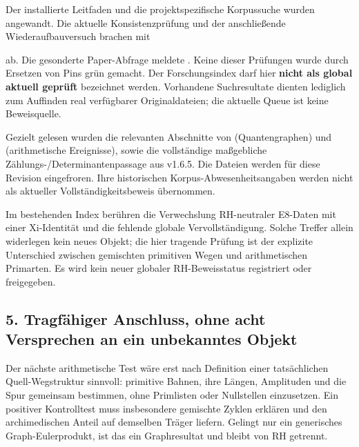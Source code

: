 Der installierte Leitfaden  und die
projektspezifische Korpussuche wurden angewandt. Die aktuelle
Konsistenzprüfung und der anschließende Wiederaufbauversuch brachen mit


ab. Die gesonderte Paper-Abfrage meldete
. Keine dieser Prüfungen
wurde durch Ersetzen von Pins grün gemacht. Der Forschungsindex darf
hier \textbf{nicht als global aktuell geprüft} bezeichnet werden.
Vorhandene Suchresultate dienten lediglich zum Auffinden real
verfügbarer Originaldateien; die aktuelle Queue ist keine Beweisquelle.

Gezielt gelesen wurden die relevanten Abschnitte von
 (Quantengraphen) und
 (arithmetische
Ereignisse), sowie die vollständige maßgebliche
Zählungs-/Determinantenpassage aus v1.6.5. Die Dateien werden für diese
Revision eingefroren. Ihre historischen Korpus-Abwesenheitsangaben
werden nicht als aktueller Vollständigkeitsbeweis übernommen.

Im bestehenden Index berühren  die
Verwechslung RH-neutraler E8-Daten mit einer Xi-Identität und
 die
fehlende globale Vervollständigung. Solche Treffer allein widerlegen
kein neues Objekt; die hier tragende Prüfung ist der explizite
Unterschied zwischen gemischten primitiven Wegen und arithmetischen
Primarten. Es wird kein neuer globaler RH-Beweisstatus registriert oder
freigegeben.

\subsection{5. Tragfähiger Anschluss, ohne acht Versprechen an ein
unbekanntes
Objekt}\label{tragfuxe4higer-anschluss-ohne-acht-versprechen-an-ein-unbekanntes-objekt}

Der nächste arithmetische Test wäre erst nach Definition einer
tatsächlichen Quell-Wegstruktur sinnvoll: primitive Bahnen, ihre Längen,
Amplituden und die Spur gemeinsam bestimmen, ohne Primlisten oder
Nullstellen einzusetzen. Ein positiver Kontrolltest muss insbesondere
gemischte Zyklen erklären und den archimedischen Anteil auf demselben
Träger liefern. Gelingt nur ein generisches Graph-Eulerprodukt, ist das
ein Graphresultat und bleibt von RH getrennt.

